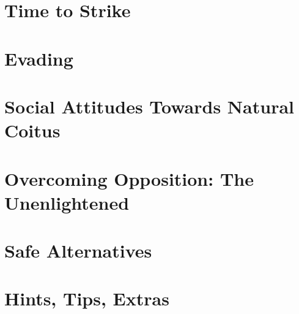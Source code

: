 \chapter{Time to Strike}


\chapter{Evading}


\chapter{Social Attitudes Towards Natural Coitus}


\chapter{Overcoming Opposition: The Unenlightened}



\chapter{Safe Alternatives}



\chapter{Hints, Tips, Extras}
